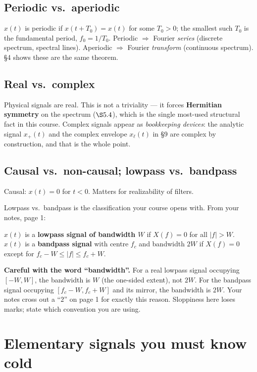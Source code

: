 \documentclass[11pt,a4paper]{article}
\begin{document}
\subsection{Periodic vs.\ aperiodic}
$x(t)$ is periodic if $x(t+T_0)=x(t)$ for some $T_0>0$; the smallest such $T_0$ is the fundamental period,
$f_0=1/T_0$. Periodic $\Rightarrow$ Fourier \emph{series} (discrete spectrum, spectral lines). Aperiodic
$\Rightarrow$ Fourier \emph{transform} (continuous spectrum). \S4 shows these are the same theorem.

\subsection{Real vs.\ complex}
Physical signals are real. This is not a triviality --- it forces \textbf{Hermitian symmetry} on the spectrum
($\S5.4$), which is the single most-used structural fact in this course. Complex signals appear as
\emph{bookkeeping devices}: the analytic signal $x_+(t)$ and the complex envelope $x_\ell(t)$ in \S9 are complex
by construction, and that is the whole point.

\subsection{Causal vs.\ non-causal; lowpass vs.\ bandpass}
Causal: $x(t)=0$ for $t<0$. Matters for realizability of filters.

Lowpass vs.\ bandpass is the classification your course opens with. From your notes, page 1:
\begin{keybox}
$x(t)$ is a \textbf{lowpass signal of bandwidth $W$} if $X(f)=0$ for all $|f|>W$.\\
$x(t)$ is a \textbf{bandpass signal} with centre $f_c$ and bandwidth $2W$ if $X(f)=0$ except for
$f_c-W\le|f|\le f_c+W$.
\end{keybox}
\textbf{Careful with the word ``bandwidth''.} For a real lowpass signal occupying $[-W,W]$, the bandwidth is
$W$ (the one-sided extent), not $2W$. For the bandpass signal occupying $[f_c-W,f_c+W]$ and its mirror, the
bandwidth is $2W$. Your notes cross out a ``$2$'' on page 1 for exactly this reason. Sloppiness here loses
marks; state which convention you are using.

\section{Elementary signals you must know cold}
\end{document}
